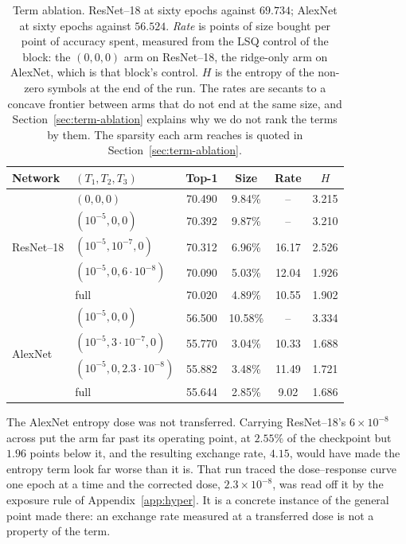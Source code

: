 \documentclass{article}
\begin{document}
\begin{table}[ht]
  \caption{Term ablation. ResNet--18 at sixty epochs against $69.734$;
  AlexNet at sixty epochs against $56.524$. \emph{Rate} is points of size bought
  per point of accuracy spent, measured from the LSQ control of the block: the
  $(0,0,0)$ arm on ResNet--18, the ridge-only arm on AlexNet, which is that
  block's control. $H$ is the entropy of the non-zero symbols at the end of the
  run. The rates are secants to a concave frontier between arms that do not end
  at the same size, and Section~\ref{sec:term-ablation} explains why we do not
  rank the terms by them. The sparsity each arm reaches is quoted in
  Section~\ref{sec:term-ablation}.}
  \label{tab:ablation}
  \centering \small
  \begin{tabular}{llcccc}
    \toprule
    Network & $(T_1,T_2,T_3)$ & Top-1 & Size & Rate & $H$ \\
    \midrule
    \multirow{5}{*}{ResNet--18}
     & $(0,0,0)$ & 70.490 & 9.84\% & -- & 3.215 \\
     & $(10^{-5},0,0)$ & 70.392 & 9.87\% & -- & 3.210 \\
     & $(10^{-5},10^{-7},0)$ & 70.312 & 6.96\% & 16.17 & 2.526 \\
     & $(10^{-5},0,6{\cdot}10^{-8})$ & 70.090 & 5.03\% & 12.04 & 1.926 \\
     & full & 70.020 & 4.89\% & 10.55 & 1.902 \\
    \midrule
    \multirow{4}{*}{AlexNet}
     & $(10^{-5},0,0)$ & 56.500 & 10.58\% & -- & 3.334 \\
     & $(10^{-5},3{\cdot}10^{-7},0)$ & 55.770 & 3.04\% & 10.33 & 1.688 \\
     & $(10^{-5},0,2.3{\cdot}10^{-8})$ & 55.882 & 3.48\% & 11.49 & 1.721 \\
     & full & 55.644 & 2.85\% & 9.02 & 1.686 \\
    \bottomrule
  \end{tabular}
\end{table}

The AlexNet entropy dose was not transferred. Carrying ResNet--18's
$6\times10^{-8}$ across put the arm far past its operating point, at $2.55\%$ of
the checkpoint but $1.96$ points below it, and the resulting exchange rate,
$4.15$, would have made the entropy term look far worse than it is. That run
traced the dose--response curve one epoch at a time and the corrected dose,
$2.3\times10^{-8}$, was read off it by the exposure rule of
Appendix~\ref{app:hyper}. It is a concrete instance of the general point made
there: an exchange rate measured at a transferred dose is not a property of the
term.
\end{document}
